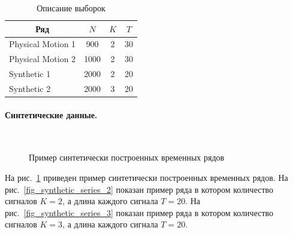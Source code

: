 \documentclass[12pt, twoside]{article}
\begin{document}
\begin{table}[h]
\begin{center}
\caption{Описание выборок}
\label{table_1}
\begin{tabular}{|c|c|c|c|}
\hline
	Ряд & $N$& $K$& $T$\\
	\hline
	\multicolumn{1}{|l|}{Physical Motion 1}
	& 900& 2& 30\\
	\hline
	\multicolumn{1}{|l|}{Physical Motion 2}
	& 1000& 2& 30\\
	\hline
	\multicolumn{1}{|l|}{Synthetic 1}
	& 2000& 2& 20\\
	\hline
	\multicolumn{1}{|l|}{Synthetic 2}
	& 2000& 3& 20\\
\hline

\end{tabular}
\end{center}
\end{table}

\paragraph{Синтетические данные.}

\begin{figure}[h!t]\center
{}
\\
\caption{Пример синтетически построенных временных рядов}
\label{fig_synthetic_series}
\end{figure}

На рис.~\ref{fig_synthetic_series} приведен пример синтетически построенных временных рядов. На рис.~\ref{fig_synthetic_series_2} показан пример ряда в котором количество сигналов $K = 2$, а длина каждого сигнала $T = 20$. На рис.~\ref{fig_synthetic_series_3} показан пример ряда в котором количество сигналов $K = 3$, а длина каждого сигнала $T = 20$. 
\end{document}
